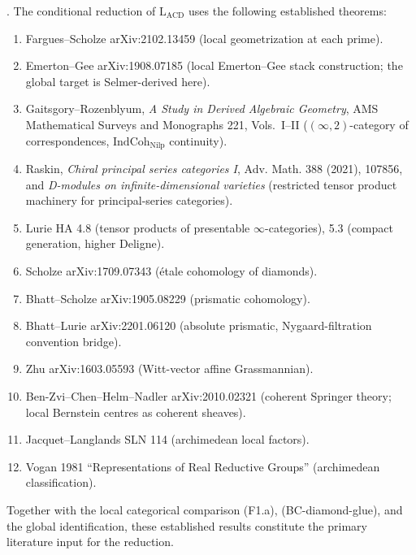 \begin{proposition}
\label{v4-arith:acd:prop:dependency-closure}
\ClaimStatusProvedHere. The conditional reduction of
\(\mathrm{L}_{\mathrm{ACD}}\) uses the following established theorems:
\begin{enumerate}
\item Fargues--Scholze arXiv:2102.13459 (local geometrization at each
prime).
\item Emerton--Gee arXiv:1908.07185 (local Emerton--Gee stack
construction; the global target is Selmer-derived here).
\item Gaitsgory--Rozenblyum, \emph{A Study in Derived Algebraic
Geometry}, AMS Mathematical Surveys and Monographs 221, Vols.~I--II
(\((\infty,2)\)-category of correspondences,
\(\mathrm{IndCoh}_{\mathrm{Nilp}}\) continuity).
\item Raskin, \emph{Chiral principal series categories I}, Adv.
Math. 388 (2021), 107856, and \emph{D-modules on infinite-dimensional
varieties} (restricted tensor product machinery for principal-series
categories).
\item Lurie HA 4.8 (tensor products of presentable \(\infty\)-categories),
5.3 (compact generation, higher Deligne).
\item Scholze arXiv:1709.07343 (\'etale cohomology of diamonds).
\item Bhatt--Scholze arXiv:1905.08229 (prismatic cohomology).
\item Bhatt--Lurie arXiv:2201.06120 (absolute prismatic,
Nygaard-filtration convention bridge).
\item Zhu arXiv:1603.05593 (Witt-vector affine Grassmannian).
\item Ben-Zvi--Chen--Helm--Nadler arXiv:2010.02321 (coherent Springer
theory; local Bernstein centres as coherent sheaves).
\item Jacquet--Langlands SLN 114 (archimedean local factors).
\item Vogan 1981 ``Representations of Real Reductive Groups''
(archimedean classification).
\end{enumerate}
Together with the local categorical comparison (F1.a),
(BC-diamond-glue), and the global identification, these established
results constitute the primary literature input for the reduction.
\end{proposition}

